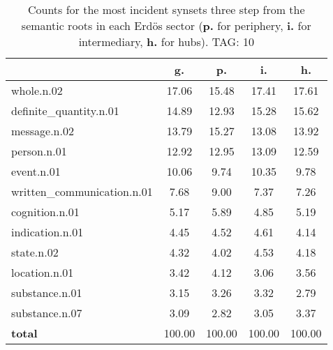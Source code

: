 \begin{table}[h!]
\begin{center}
\begin{tabular}{| l || c | c | c | c |}\hline
 & {\bf g.} & {\bf p.} & {\bf i.} & {\bf h.} \\\hline\hline
whole.n.02 & 17.06  & 15.48  & 17.41  & 17.61 \\\hline
definite\_quantity.n.01 & 14.89  & 12.93  & 15.28  & 15.62 \\\hline
message.n.02 & 13.79  & 15.27  & 13.08  & 13.92 \\\hline
person.n.01 & 12.92  & 12.95  & 13.09  & 12.59 \\\hline
event.n.01 & 10.06  & 9.74  & 10.35  & 9.78 \\\hline
written\_communication.n.01 & 7.68  & 9.00  & 7.37  & 7.26 \\\hline
cognition.n.01 & 5.17  & 5.89  & 4.85  & 5.19 \\\hline
indication.n.01 & 4.45  & 4.52  & 4.61  & 4.14 \\\hline
state.n.02 & 4.32  & 4.02  & 4.53  & 4.18 \\\hline
location.n.01 & 3.42  & 4.12  & 3.06  & 3.56 \\\hline
substance.n.01 & 3.15  & 3.26  & 3.32  & 2.79 \\\hline
substance.n.07 & 3.09  & 2.82  & 3.05  & 3.37 \\\hline\hline
{{\bf total}} & 100.00  & 100.00  & 100.00  & 100.00 \\\hline
\end{tabular}
\caption{Counts for the most incident synsets three step from the semantic roots in each Erd\"os sector ({\bf p.} for periphery, {\bf i.} for intermediary, {\bf h.} for hubs). TAG: 10}
\end{center}
\end{table}